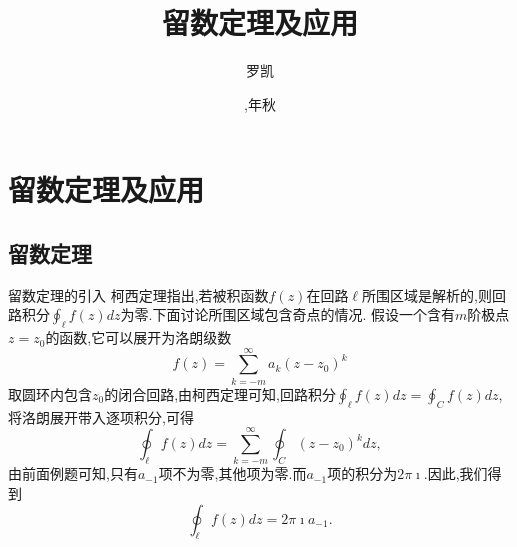 \documentclass[fontset=windows, chinese, 10pt]{beamer}
\title{留数定理及应用}
\date{\zhdigits{2025},\zhganzhinian{2025}年秋}
\author{罗凯}
\institute{南京理工大学物理学院}
\begin{document}

  

  
  
  
  \begin{frame}
  \titlepage
  \end{frame}
  
  

\section{留数定理及应用}

\subsection{留数定理}
\label{subsec:residue_theorem}


\begin{frame}{留数定理的引入}
  \small
柯西定理指出,若被积函数$f(z)$在回路$\ell$所围区域是解析的,则回路积分$\oint_\ell f(z) dz$为零.下面讨论所围区域包含奇点的情况.
假设一个含有$m$阶极点$z=z_0$的函数,它可以展开为洛朗级数
$$
  f(z) = \sum_{k = -m} ^{\infty} a_k (z - z_0)^k  
$$
取圆环内包含$z_0$的闭合回路,由柯西定理可知,回路积分$\oint_\ell f(z) dz = \oint_C f(z) dz$, 将洛朗展开带入逐项积分,可得
$$
\oint_\ell f(z) dz = \sum_{k = -m} ^{\infty} \oint_C  (z - z_0)^k dz,
$$
由前面例题可知,只有$a_{-1}$项不为零,其他项为零.而$a_{-1}$项的积分为$2\pi\imath$.因此,我们得到
\begin{equation}
    \oint_\ell f(z) dz = 2\pi \imath a_{-1} .
\end{equation}
\end{frame}
\end{document}
